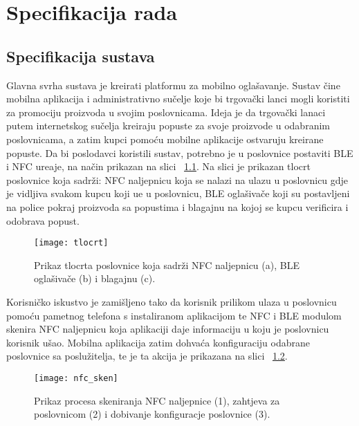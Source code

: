 \chapter{Specifikacija rada}


\section{Specifikacija sustava}

Glavna svrha sustava je kreirati platformu za mobilno ogla\v{s}avanje. Sustav \v{c}ine mobilna aplikacija i administrativno su\v{c}elje koje bi trgova\v{c}ki lanci mogli koristiti za promociju proizvoda u svojim poslovnicama. Ideja je da trgova\v{c}ki lanaci putem internetskog su\v{c}elja kreiraju popuste za svoje proizvode u odabranim poslovnicama, a zatim kupci pomo\'{c}u mobilne aplikacije ostvaruju kreirane popuste. Da bi poslodavci koristili sustav, potrebno je u poslovnice postaviti BLE i NFC ure\dj aje, na na\v{c}in prikazan na slici ~\ref{fig:tlocrt}. Na slici je prikazan tlocrt poslovnice koja sadr\v{z}i: NFC naljepnicu koja se nalazi na ulazu u poslovnicu gdje je vidljiva svakom kupcu koji u\dj e u poslovnicu, BLE ogla\v{s}iva\v{c}e koji su postavljeni na police pokraj proizvoda sa popustima i blagajnu na kojoj se kupcu verificira i odobrava popust.

\begin{figure}[!htbp]
	\begin{center}
 \texttt{[image: tlocrt]}
 \caption{Prikaz tlocrta poslovnice koja sadr\v{z}i NFC naljepnicu (a), BLE ogla\v{s}iva\v{c}e (b) i blagajnu (c).}
 \label{fig:tlocrt}
	\end{center}
\end{figure}

Korisni\v{c}ko iskustvo je zami\v{s}ljeno tako da korisnik prilikom ulaza u poslovnicu pomo\'{c}u pametnog telefona s instaliranom aplikacijom te NFC i BLE modulom skenira NFC naljepnicu koja aplikaciji daje informaciju u koju je poslovnicu korisnik u\v{s}ao. Mobilna aplikacija zatim dohva\'{c}a konfiguraciju odabrane poslovnice sa poslu\v{z}itelja, te je ta akcija je prikazana na slici ~\ref{fig:skeniranjeNaljepnice}.

\begin{figure}[!htbp]
	\begin{center}
 \texttt{[image: nfc\_sken]}
 \caption{Prikaz procesa skeniranja NFC naljepnice (1), zahtjeva za poslovnicom (2) i dobivanje konfiguracje poslovnice (3).}
 \label{fig:skeniranjeNaljepnice}
	\end{center}
\end{figure}

